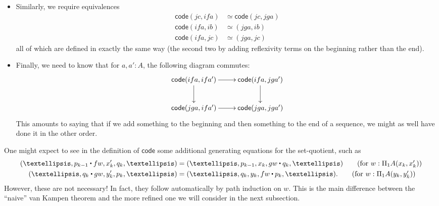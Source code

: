 \documentclass[10pt,a4paper]{article}
\newcommand{\refl}[1]{\ensuremath{\mathsf{refl}_{#1}}\xspace}
\newcommand{\ct}{%
  \mathchoice{\mathbin{\raisebox{0.5ex}{$\displaystyle\centerdot$}}}%
             {\mathbin{\raisebox{0.5ex}{$\centerdot$}}}%
             {\mathbin{\raisebox{0.25ex}{$\scriptstyle\,\centerdot\,$}}}%
             {\mathbin{\raisebox{0.1ex}{$\scriptscriptstyle\,\centerdot\,$}}}
}
\newcommand{\eqvsym}{\simeq}    %
\newcommand{\code}{\ensuremath{\mathsf{code}}\xspace}
\theoremstyle{definition}
\theoremstyle{remark}
\numberwithin{equation}{section}
\begin{document}
\begin{itemize}
  \[ (\dots, y_n, p_n,fa) \mapsto
  (\dots,y_n,p_n,a,\refl{ga},a,\refl{fa},fa)
  \]
  which is equal to the identity by a generating equality of the quotient.
  The other composite is analogous.
  Thus we have defined an equivalence~\eqref{eq:bfa-bga}.
\item Similarly, we require equivalences
  \begin{align*}
    \code(jc,ifa) &\eqvsym \code(jc,jga)\\
    \code(ifa,ib)&\eqvsym (jga,ib)\\
    \code(ifa,jc)&\eqvsym (jga,jc)
  \end{align*}
  all of which are defined in exactly the same way (the second two by adding reflexivity terms on the beginning rather than the end).
\item Finally, we need to know that for $a,a':A$, the following diagram commutes:
  \begin{equation}\label{eq:bfa-bga-comm}
  \vcenter{\xymatrix{
      \code(ifa,ifa') \ar[r]\ar[d] &
      \code(ifa,jga')\ar[d]\\
      \code(jga,ifa')\ar[r] &
      \code(jga,jga')
      }}
  \end{equation}
  This amounts to saying that if we add something to the beginning and then something to the end of a sequence, we might as well have done it in the other order.
\end{itemize}

\begin{rmk}\label{rmk:naive}
  One might expect to see in the definition of \code some additional generating equations for the set-quotient, such as
  \begin{align*}
    (\dots, p_{k-1} \ct fw, x_{k}', q_{k}, \dots) &=
    (\dots, p_{k-1}, x_{k}, gw \ct q_{k}, \dots)
    \tag{for $w:\Pi_1A(x_{k},x_{k}')$}\\
    (\dots, q_k \ct gw, y_k', p_k, \dots) &=
    (\dots, q_k, y_k, fw \ct p_k, \dots).
    \tag{for $w:\Pi_1A(y_k, y_k')$}
  \end{align*}
  However, these are not necessary!
  In fact, they follow automatically by path induction on $w$.
  This is the main difference between the ``naive'' van Kampen theorem and the more refined one we will consider in the next subsection.
\end{rmk}
\end{document}
